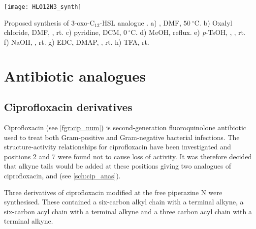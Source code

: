 \begin{scheme}[H]
	\begin{center}
		\texttt{[image: HLO12N3\_synth]}
		\caption{Proposed synthesis of 3-oxo-C$_{12}$-HSL analogue .
		a) , DMF, $50\ ^{\circ}$C\cite{Khoukhi1987}.
		b) Oxalyl chloride, DMF, , rt\cite{Chaturvedi2012,Khoukhi1987}.
		c) pyridine, DCM, $0\ ^{\circ}$C\cite{Khoukhi1987, Hodgkinson2011b}. 
		d) MeOH, reflux\cite{Khoukhi1987, Hodgkinson2011b}.
		e) \textit{p}-TsOH, , , rt\cite{Hodgkinson2011b}.
		f) NaOH, , rt\cite{Hodgkinson2011b}.
		g) EDC, DMAP, , rt\cite{Hodgkinson2011b}.
		h) TFA, rt\cite{Hodgkinson2011b}. 
		\label{sch:HLO12N3_synth}}
	\end{center}
\end{scheme}

\newpage

\section{Antibiotic analogues}

\subsection{Ciprofloxacin derivatives}

Ciprofloxacin  (see \ref{fgr:cip_num}) is second-generation fluoroquinolone antibiotic used to treat both Gram-positive and Gram-negative bacterial infections\cite{Oliphant2002}.
The structure-activity relationships for ciprofloxacin have been investigated \cite{Renau1996} and positions 2 and 7 were found not to cause loss of activity. It was therefore decided that alkyne tails would be added at these positions giving two analogues of ciprofloxacin,  and  (see \ref{sch:cip_anas}).

Three derivatives of ciprofloxacin modified at the free piperazine N were synthesised. These contained a six-carbon alkyl chain with a terminal alkyne, a six-carbon acyl chain with a terminal alkyne and a three carbon acyl chain with a terminal alkyne.

